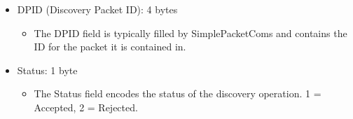 \documentclass{article}
\begin{document}
\begin{itemize}
    \item DPID (Discovery Packet ID): 4 bytes
    \begin{itemize}
        \item The DPID field is typically filled by SimplePacketComs and contains the ID for the
        packet it is contained in.
    \end{itemize}

    \item Status: 1 byte
    \begin{itemize}
        \item The Status field encodes the status of the discovery operation. 1 = Accepted, 2 =
        Rejected.
    \end{itemize}
\end{itemize}
\end{document}
